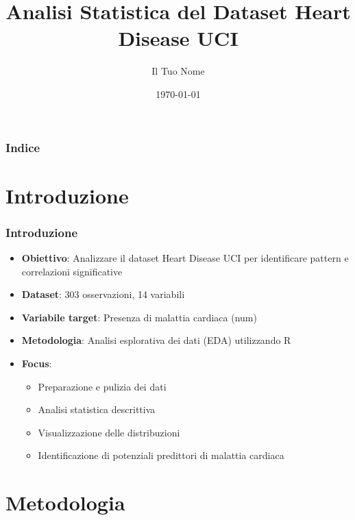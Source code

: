 \documentclass{beamer}
\title{Analisi Statistica del Dataset Heart Disease UCI}
\author{Il Tuo Nome}
\institute{Dipartimento di Statistica, Università XYZ}
\date{\today}
\begin{document}
\frame{\titlepage}

\begin{frame}
\frametitle{Indice}
\tableofcontents
\end{frame}

\section{Introduzione}

\begin{frame}
\frametitle{Introduzione}
\begin{itemize}
    \item \textbf{Obiettivo}: Analizzare il dataset Heart Disease UCI per identificare pattern e correlazioni significative
    \item \textbf{Dataset}: 303 osservazioni, 14 variabili
    \item \textbf{Variabile target}: Presenza di malattia cardiaca (num)
    \item \textbf{Metodologia}: Analisi esplorativa dei dati (EDA) utilizzando R
    \item \textbf{Focus}:
    \begin{itemize}
        \item Preparazione e pulizia dei dati
        \item Analisi statistica descrittiva
        \item Visualizzazione delle distribuzioni
        \item Identificazione di potenziali predittori di malattia cardiaca
    \end{itemize}
\end{itemize}
\end{frame}

\section{Metodologia}
\end{document}
